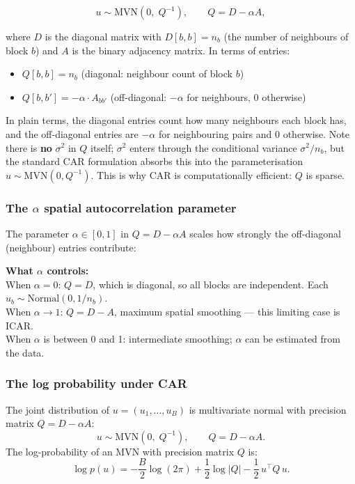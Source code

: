\documentclass[12pt,a4paper]{article}
\begin{document}
$$ u \sim \text{MVN}(0,\; Q^{-1}), \qquad Q = D - \alpha A, $$

\noindent where $D$ is the diagonal matrix with $D[b,b] = n_b$ (the number of neighbours of block $b$) and $A$ is the binary adjacency matrix. In terms of entries:
\begin{itemize}
  \item $Q[b,b] = n_b$ \quad (diagonal: neighbour count of block $b$)
  \item $Q[b,b'] = -\alpha \cdot A_{bb'}$ \quad (off-diagonal: $-\alpha$ for neighbours, 0 otherwise)
\end{itemize}
In plain terms, the diagonal entries count how many neighbours each block has, and the off-diagonal entries are $-\alpha$ for neighbouring pairs and 0 otherwise. Note there is \textbf{no} $\sigma^2$ in $Q$ itself; $\sigma^2$ enters through the conditional variance $\sigma^2/n_b$, but the standard CAR formulation absorbs this into the parameterisation $u \sim \text{MVN}(0, Q^{-1})$. This is why CAR is computationally efficient: $Q$ is sparse.

\subsubsection{The \texorpdfstring{$\alpha$}{alpha} spatial autocorrelation parameter}
The parameter $\alpha \in [0,1]$ in $Q = D - \alpha A$ scales how strongly the off-diagonal (neighbour) entries contribute:

\textbf{What $\alpha$ controls:}\\
When $\alpha = 0$: $Q = D$, which is diagonal, so all blocks are independent. Each $u_b \sim \text{Normal}(0, 1/n_b)$.\\
When $\alpha \to 1$: $Q = D - A$, maximum spatial smoothing — this limiting case is ICAR.\\
When $\alpha$ is between 0 and 1: intermediate smoothing; $\alpha$ can be estimated from the data.



\subsubsection{The log probability under CAR}
The joint distribution of $u = (u_1,\ldots,u_B)$ is multivariate normal with precision matrix $Q = D - \alpha A$:
$$u \sim \text{MVN}(0,\; Q^{-1}), \qquad Q = D - \alpha A.$$
The log-probability of an MVN with precision matrix $Q$ is:
$$\log p(u) = -\frac{B}{2}\log(2\pi) + \frac{1}{2}\log|Q| - \frac{1}{2}\,u^\top Q\, u.$$
\end{document}
